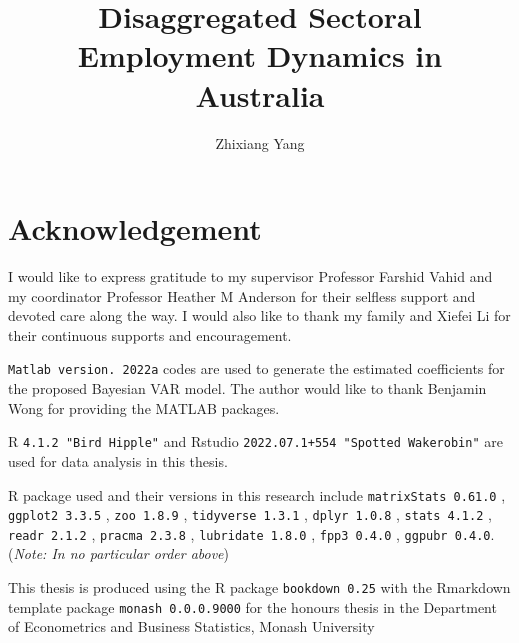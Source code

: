 \documentclass{monashthesis}
\author{Zhixiang Yang}
\title{Disaggregated Sectoral Employment Dynamics in Australia}
\begin{document}

\titlepage

{\sf\tighttoc\doublespacing}

\clearpage{}\setcounter{page}{0}

\hypertarget{acknowledgement}{%
\chapter*{Acknowledgement}\label{acknowledgement}}

I would like to express gratitude to my supervisor Professor Farshid Vahid and my coordinator Professor Heather M Anderson for their selfless support and devoted care along the way. I would also like to thank my family and Xiefei Li for their continuous supports and encouragement.

\vspace{48pt}

\texttt{Matlab\ version.\ 2022a} codes are used to generate the estimated coefficients for the proposed Bayesian VAR model. The author would like to thank Benjamin Wong for providing the MATLAB packages.

R \texttt{4.1.2\ "Bird\ Hipple"} \autocite{R} and Rstudio \texttt{2022.07.1+554\ "Spotted\ Wakerobin"} \autocite{Rstudio} are used for data analysis in this thesis.

\vspace{12pt}

R package used and their versions in this research include \texttt{matrixStats\ 0.61.0} \autocite{package_matrixStats}, \texttt{ggplot2\ 3.3.5} \autocite{package_ggplot2}, \texttt{zoo\ 1.8.9} \autocite{zoo}, \texttt{tidyverse\ 1.3.1} \autocite{tidyverse}, \texttt{dplyr\ 1.0.8} \autocite{dplyr}, \texttt{stats\ 4.1.2} \autocite{stats}, \texttt{readr\ 2.1.2} \autocite{readr}, \texttt{pracma\ 2.3.8} \autocite{pracma}, \texttt{lubridate\ 1.8.0} \autocite{lubridate}, \texttt{fpp3\ 0.4.0} \autocite{fpp3}, \texttt{ggpubr\ 0.4.0}\autocite{ggpubr}.
(\emph{Note: In no particular order above})

\vspace{12pt}

This thesis is produced using the R package \texttt{bookdown\ 0.25} \autocite{bookdown} with the Rmarkdown template package \texttt{monash\ 0.0.0.9000} for the honours thesis in the Department of Econometrics and Business Statistics, Monash University \autocite{monash}
\end{document}
